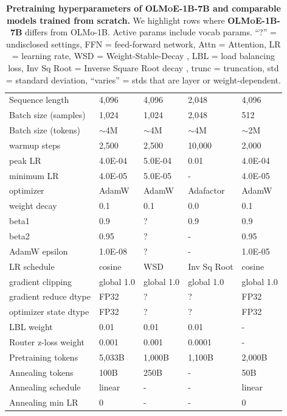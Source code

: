\documentclass{article}
\newcommand{\modelsmall}{\textbf{\textsc{OLMoE-1B-7B}}}
\begin{document}
\begin{table}[htbp]
\begin{tabular}{l|lll|l}
\midrule
Sequence length & 4,096 & 4,096 & 2,048 & 4,096 \\
\rowcolor{lightOlmoeYellow}
Batch size (samples) & 1,024 & 1,024 & 2,048 & 512 \\
\rowcolor{lightOlmoeYellow}
Batch size (tokens) & $\sim$4M & $\sim$4M & $\sim$4M & $\sim$2M \\
warmup steps & 2,500 & 2,500 & 10,000 & 2,000 \\
peak LR & 4.0E-04 & 5.0E-04 & 0.01 & 4.0E-04 \\
minimum LR & 4.0E-05 & 5.0E-05 & - & 4.0E-05 \\
optimizer & AdamW & AdamW & Adafactor & AdamW \\
weight decay & 0.1 & 0.1 & 0.0 & 0.1 \\
beta1 & 0.9 & ? & 0.9 & 0.9 \\
beta2 & 0.95 & ? & - & 0.95 \\
\rowcolor{lightOlmoeYellow}
AdamW epsilon & 1.0E-08 & ? & - & 1.0E-05 \\
LR schedule & cosine & WSD & Inv Sq Root & cosine \\
gradient clipping & global 1.0 & global 1.0 & global 1.0 & global 1.0 \\
gradient reduce dtype & FP32 & ? & ? & FP32 \\
optimizer state dtype & FP32 & ? & ? & FP32 \\
\rowcolor{lightOlmoeYellow}
LBL weight & 0.01 & 0.01 & 0.01 & - \\
\rowcolor{lightOlmoeYellow}
Router z-loss weight & 0.001 & 0.001 & 0.0001 & - \\
\rowcolor{lightOlmoeYellow}
Pretraining tokens & 5,033B & 1,000B & 1,100B & 2,000B \\
\rowcolor{lightOlmoeYellow}
Annealing tokens & 100B & 250B & - & 50B \\
Annealing schedule & linear & - & - & linear \\
Annealing min LR & 0 & - & - & 0 \\   
\bottomrule
\end{tabular}
\vspace{1em}
\caption{\textbf{Pretraining hyperparameters of \modelsmall{} and comparable models trained from scratch.} We highlight rows where \modelsmall{} differs from OLMo-1B. Active params include vocab params. ``?'' = undisclosed settings, FFN = feed-forward network, Attn = Attention, LR = learning rate, WSD = Weight-Stable-Decay \citep{hu2024minicpm}, LBL = load balancing loss, Inv Sq Root = Inverse Square Root decay \citep{shazeer2018adafactoradaptivelearningrates}, trunc = truncation, std = standard deviation, ``varies'' = stds that are layer or weight-dependent.}
\label{tab:hp}
\end{table}
\end{document}
